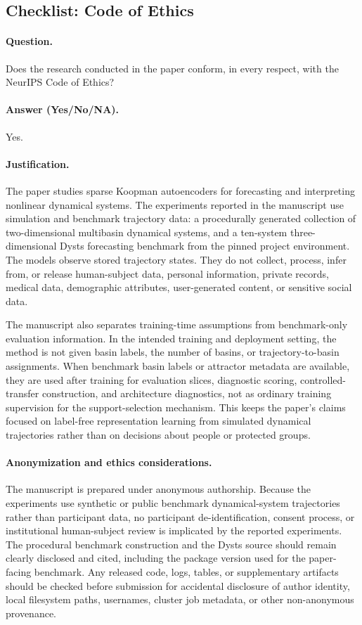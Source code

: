 \subsection{Checklist: Code of Ethics}
\label{app:checklist_code_of_ethics}

\paragraph{Question.}
Does the research conducted in the paper conform, in every respect, with the
NeurIPS Code of Ethics?

\paragraph{Answer (Yes/No/NA).}
Yes.

\paragraph{Justification.}
The paper studies sparse Koopman autoencoders for forecasting and interpreting
nonlinear dynamical systems. The experiments reported in the manuscript use
simulation and benchmark trajectory data: a procedurally generated collection
of two-dimensional multibasin dynamical systems, and a ten-system
three-dimensional Dysts forecasting benchmark from the pinned project
environment. The models observe stored trajectory states. They do not collect,
process, infer from, or release human-subject data, personal information,
private records, medical data, demographic attributes, user-generated content,
or sensitive social data.

The manuscript also separates training-time assumptions from benchmark-only
evaluation information. In the intended training and deployment setting, the
method is not given basin labels, the number of basins, or trajectory-to-basin
assignments. When benchmark basin labels or attractor metadata are available,
they are used after training for evaluation slices, diagnostic scoring,
controlled-transfer construction, and architecture diagnostics, not as ordinary
training supervision for the support-selection mechanism. This keeps the paper's
claims focused on label-free representation learning from simulated dynamical
trajectories rather than on decisions about people or protected groups.

\paragraph{Anonymization and ethics considerations.}
The manuscript is prepared under anonymous authorship. Because the experiments
use synthetic or public benchmark dynamical-system trajectories rather than
participant data, no participant de-identification, consent process, or
institutional human-subject review is implicated by the reported experiments.
The procedural benchmark construction and the Dysts source should remain
clearly disclosed and cited, including the package version used for the
paper-facing benchmark. Any released code, logs, tables, or supplementary
artifacts should be checked before submission for accidental disclosure of
author identity, local filesystem paths, usernames, cluster job metadata, or
other non-anonymous provenance.

